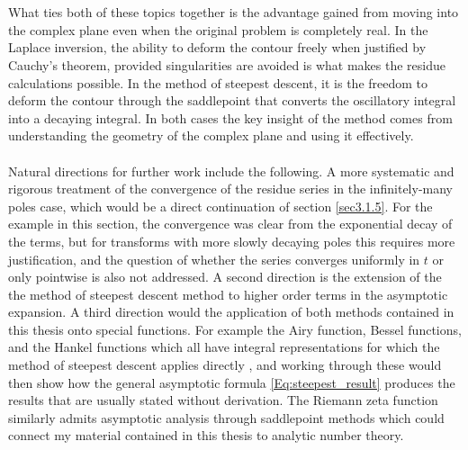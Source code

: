 \\
\\
What ties both of these topics together is the advantage gained from moving into the complex plane even when the original problem is completely real. In the Laplace inversion, the ability to deform the contour freely when justified by Cauchy's theorem, provided singularities are avoided is what makes the residue calculations possible. In the method of steepest descent, it is the freedom to deform the contour through the saddlepoint that converts the oscillatory integral into a decaying integral. In both cases the key insight of the method comes from understanding the geometry of the complex plane and using it effectively. 
\\
\\
Natural directions for further work include the following. A more systematic and rigorous treatment of the convergence of the residue series in the infinitely-many poles case, which would be a direct continuation of section \ref{sec3.1.5}. For the example in this section, the convergence was clear from the exponential decay of the terms, but for transforms with more slowly decaying poles this requires more justification, and the question of whether the series converges uniformly in $t$ or only pointwise is also not addressed. 
A second direction is the extension of the the method of steepest descent method to higher order terms in the asymptotic expansion. 
A third direction would the application of both methods contained in this thesis onto special functions. For example the Airy function, Bessel functions, and the Hankel functions which all have integral representations for which the method of steepest descent applies directly , and working through these would then show how the general asymptotic formula \ref{Eq:steepest_result} produces the results that are usually stated without derivation. 
The Riemann zeta function similarly admits asymptotic analysis through saddlepoint methods which could connect my material contained in this thesis to analytic number theory.
